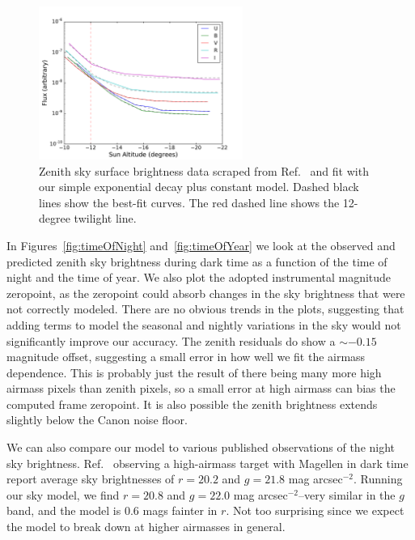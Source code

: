 \documentclass[]{spie}
\begin{document}
\begin{figure}[ht]
  \begin{center}
  \includegraphics[height=5cm]{plots/patatFits.pdf}
  \end{center}
  \caption{Zenith sky surface brightness data scraped from Ref.~ and fit with our simple exponential decay plus constant model. Dashed black lines show the best-fit curves.  The red dashed line shows the 12-degree twilight line.  \label{fig:Patat} }
\end{figure}

\clearpage

In Figures~\ref{fig:timeOfNight} and~\ref{fig:timeOfYear} we look at the observed and predicted zenith sky brightness during dark time as a function of the time of night and the time of year.  We also plot the adopted instrumental magnitude zeropoint, as the zeropoint could absorb changes in the sky brightness that were not correctly modeled.  There are no obvious trends in the plots, suggesting that adding terms to model the seasonal and nightly variations in the sky would not significantly improve our accuracy.  The zenith residuals do show a $\sim-0.15$ magnitude offset, suggesting a small error in how well we fit the airmass dependence.  This is probably just the result of there being many more high airmass pixels than zenith pixels, so a small error at high airmass can bias the computed frame zeropoint. It is also possible the zenith brightness extends slightly below the Canon noise floor.

We can also compare our model to various published observations of the night sky brightness.  Ref.~ observing a high-airmass target with Magellen in dark time report average sky brightnesses of $r=20.2$ and $g=21.8$ mag arcsec$^{-2}$.  Running our sky model, we find  $r=20.8$ and $g=22.0$ mag arcsec$^{-2}$--very similar in the $g$ band, and the model is 0.6 mags fainter in $r$.  Not too surprising since we expect the model to break down at higher airmasses in general.
\end{document}

